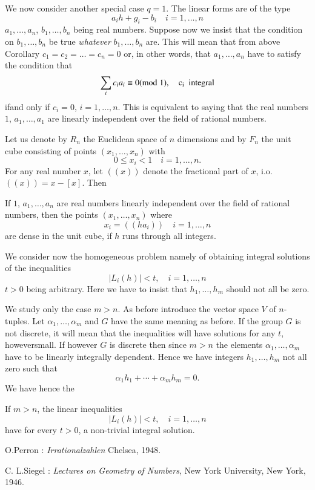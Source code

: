 We now consider another special case $q=1$. The linear forms are of
the type
$$
a_{i}h+g_{i}-b_{i}\quad i=1,\ldots,n
$$
$a_{1},\ldots,a_{n}$, $b_{1},\ldots,b_{n}$ being real numbers. Suppose
now we insist that the condition on $b_{1},\ldots,b_{n}$ be true {\em
  whatever} $b_{1},\ldots,b_{n}$ are. This will mean that from above
Corollary $c_{1}=c_{2}=\ldots=c_{n}=0$ or, in other words, that
$a_{1},\ldots,a_{n}$ have to satisfy the condition that
$$
\sum_{i}c_{i}a_{i}\equiv 0(\rm{mod} \; 1),\quad c_{i}\text{ \  integral}
$$
if\pageoriginale and only if $c_{i}=0$, $i=1,\ldots,n$. This is
equivalent to saying that the real numbers $1$, $a_{1},\ldots,a_{1}$
are linearly independent over the field of rational numbers.

Let us denote by $R_{n}$ the Euclidean space of $n$ dimensions and by
$F_{n}$ the unit cube consisting of points $(x_{1},\ldots,x_{n})$ with
$$
0\leq x_{i}<1\quad i=1,\ldots,n.
$$
For any real number $x$, let $((x))$ denote the fractional part of
$x$, i.o.\@ $((x))=x-[x]$. Then

\begin{cor}\label{chap1:coro2}
If $1$, $a_{1},\ldots,a_{n}$ are real numbers linearly independent
over the field of rational numbers, then the points
$(x_{1},\ldots,x_{n})$ where
$$
x_{i}=((ha_{i}))\quad i=1,\ldots,n
$$
are dense in the unit cube, if $h$ runs through all integers.
\end{cor}

We consider now the homogeneous problem namely of obtaining integral
solutions of the inequalities
$$
|L_{i}(h)|<t,\quad i=1,\ldots,n
$$
$t>0$ being arbitrary. Here we have to insist that
$h_{1},\ldots,h_{m}$ should not all be zero.

We study only the case $m>n$. As before introduce the vector space $V$
of $n$-tuples. Let $\alpha_{1},\ldots,\alpha_{m}$ and $G$ have the
same meaning as before. If the group $G$ is not discrete, it will mean
that the inequalities will have solutions for any $t$,
however\pageoriginale small. If however $G$ is discrete then since 
$m > n$ the elements $\alpha_{1},\ldots,\alpha_{m}$ have to be linearly
integrally dependent. Hence we have integers $h_{1},\ldots,h_{m}$ not
all zero such that
$$
\alpha_{1}h_{1}+\cdots+\alpha_{m}h_{m}=0.
$$
We have hence the

\begin{thm}\label{chap1:thm6}
If $m>n$, the linear inequalities
$$
|L_{i}(h)|<t,\quad i=1,\ldots,n
$$
have for every $t>0$, a non-trivial integral solution.
\end{thm}



\begin{thebibliography}{99}
 O.\@ Perron : {\em Irrationalzahlen} Chelsea, 1948.

 C. L.\@ Siegel : {\em Lectures on Geometry of Numbers},
 New York University, New York, 1946.
\end{thebibliography}
